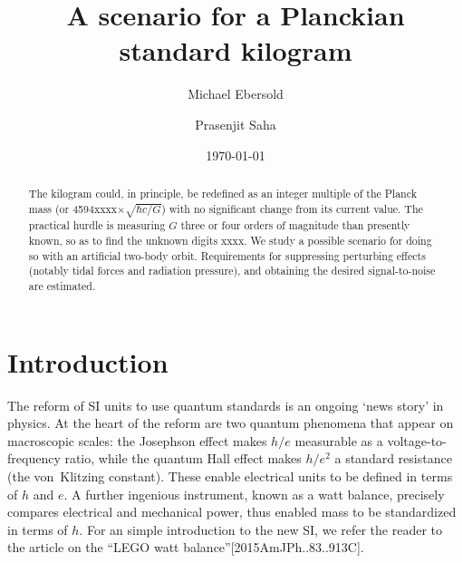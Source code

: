 \documentclass[prb,preprint]{revtex4-1}
\begin{document}

\title{A scenario for a Planckian standard kilogram}

\author{Michael Ebersold}
\author{Prasenjit Saha}


\date{\today}

\begin{abstract}
The kilogram could, in principle, be redefined as an integer multiple
of the Planck mass (or 4594xxxx$\times\sqrt{\hbar c/G}$) with no
significant change from its current value.  The practical hurdle is
measuring $G$ three or four orders of magnitude than presently known,
so as to find the unknown digits xxxx.  We study a possible scenario
for doing so with an artificial two-body orbit.  Requirements for
suppressing perturbing effects (notably tidal forces and radiation
pressure), and obtaining the desired signal-to-noise are estimated.
\end{abstract}

\maketitle

\section{Introduction}

The reform of SI units to use quantum standards is an ongoing `news
story' in physics.  At the heart of the reform are two quantum
phenomena that appear on macroscopic scales: the Josephson effect
makes $h/e$ measurable as a voltage-to-frequency ratio, while the
quantum Hall effect makes $h/e^2$ a standard resistance (the
von~Klitzing constant).  These enable electrical units to be defined
in terms of $h$ and $e$.  A further ingenious instrument, known as a
watt balance, precisely compares electrical and mechanical power, thus
enabled mass to be standardized in terms of $h$.  For an simple
introduction to the new SI, we refer the reader to the article on the
``LEGO watt balance''[2015AmJPh..83..913C].
\end{document}
